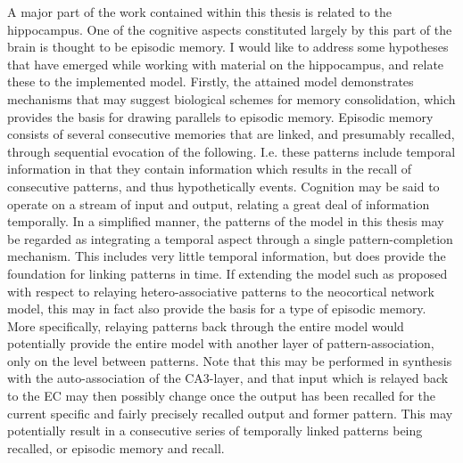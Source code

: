 
A major part of the work contained within this thesis is related to the hippocampus. One of the cognitive aspects constituted largely by this part of the brain is thought to be episodic memory. I would like to address some hypotheses that have emerged while working with material on the hippocampus, and relate these to the implemented model.
Firstly, the attained model demonstrates mechanisms that may suggest biological schemes for memory consolidation, which provides the basis for drawing parallels to episodic memory. Episodic memory consists of several consecutive memories that are linked, and presumably recalled, through sequential evocation of the following. I.e. these patterns include temporal information in that they contain information which results in the recall of consecutive patterns, and thus hypothetically events.
Cognition may be said to operate on a stream of input and output, relating a great deal of information temporally. 
In a simplified manner, the patterns of the model in this thesis may be regarded as integrating a temporal aspect through a single pattern-completion mechanism. This includes very little temporal information, but does provide the foundation for linking patterns in time. 
If extending the model such as proposed with respect to relaying hetero-associative patterns to the neocortical network model, this may in fact also provide the basis for a type of episodic memory.
More specifically, relaying patterns back through the entire model would potentially provide the entire model with another layer of pattern-association, only on the level between patterns. Note that this may be performed in synthesis with the auto-association of the CA3-layer, and that input which is relayed back to the EC may then possibly change once the output has been recalled for the current specific and fairly precisely recalled output and former pattern. This may potentially result in a consecutive series of temporally linked patterns being recalled, or episodic memory and recall.

